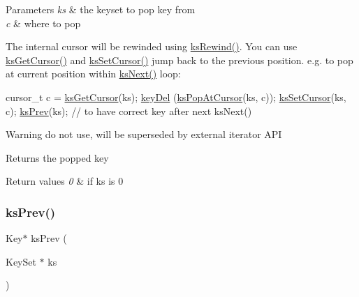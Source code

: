 \begin{DoxyParams}{Parameters}
{\em ks} & the keyset to pop key from \\
\hline
{\em c} & where to pop\\
\hline
\end{DoxyParams}
The internal cursor will be rewinded using \hyperlink{group__keyset_gabe793ff51f1728e3429c84a8a9086b70}{ks\+Rewind()}. You can use \hyperlink{group__keyset_gaffe507ab9281c322eb16c3e992075d29}{ks\+Get\+Cursor()} and \hyperlink{group__keyset_gad94c9ffaa3e8034564c0712fd407c345}{ks\+Set\+Cursor()} jump back to the previous position. e.\+g. to pop at current position within \hyperlink{group__keyset_ga317321c9065b5a4b3e33fe1c399bcec9}{ks\+Next()} loop\+: 
\begin{DoxyCode}
cursor\_t c = \hyperlink{group__keyset_gaffe507ab9281c322eb16c3e992075d29}{ksGetCursor}(ks);
\hyperlink{group__key_ga3df95bbc2494e3e6703ece5639be5bb1}{keyDel} (\hyperlink{group__api_ga32f8e3258033e970589f23d9d7102bd1}{ksPopAtCursor}(ks, c));
\hyperlink{group__keyset_gad94c9ffaa3e8034564c0712fd407c345}{ksSetCursor}(ks, c);
\hyperlink{group__api_gae7d268f13dd89a6e126b3718b117996f}{ksPrev}(ks); \textcolor{comment}{// to have correct key after next ksNext()}
\end{DoxyCode}


\begin{DoxyWarning}{Warning}
do not use, will be superseded by external iterator A\+PI
\end{DoxyWarning}
\begin{DoxyReturn}{Returns}
the popped key 
\end{DoxyReturn}

\begin{DoxyRetVals}{Return values}
{\em 0} & if ks is 0 \\
\hline
\end{DoxyRetVals}
\mbox{\label{group__api_gae7d268f13dd89a6e126b3718b117996f}} 
\subsubsection{\texorpdfstring{ks\+Prev()}{ksPrev()}}
{\footnotesize\ttfamily Key$\ast$ ks\+Prev (\begin{DoxyParamCaption}\item[{Key\+Set $\ast$}]{ks }\end{DoxyParamCaption})}



